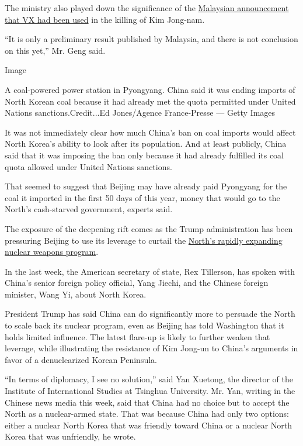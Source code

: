 The ministry also played down the significance of the
\href{https://www.nytimes.com/2017/02/23/world/asia/kim-jong-nam-vx-nerve-agent-.html}{Malaysian
announcement that VX had been used} in the killing of Kim Jong-nam.

``It is only a preliminary result published by Malaysia, and there is
not conclusion on this yet,'' Mr. Geng said.

Image

A coal-powered power station in Pyongyang. China said it was ending
imports of North Korean coal because it had already met the quota
permitted under United Nations sanctions.Credit...Ed Jones/Agence
France-Presse --- Getty Images

It was not immediately clear how much China's ban on coal imports would
affect North Korea's ability to look after its population. And at least
publicly, China said that it was imposing the ban only because it had
already fulfilled its coal quota allowed under United Nations sanctions.

That seemed to suggest that Beijing may have already paid Pyongyang for
the coal it imported in the first 50 days of this year, money that would
go to the North's cash-starved government, experts said.

The exposure of the deepening rift comes as the Trump administration has
been pressuring Beijing to use its leverage to curtail the
\href{https://www.nytimes.com/2017/02/17/world/asia/north-korea-nuclear-threat.html}{North's
rapidly expanding nuclear weapons program}.

In the last week, the American secretary of state, Rex Tillerson, has
spoken with China's senior foreign policy official, Yang Jiechi, and the
Chinese foreign minister, Wang Yi, about North Korea.

President Trump has said China can do significantly more to persuade the
North to scale back its nuclear program, even as Beijing has told
Washington that it holds limited influence. The latest flare-up is
likely to further weaken that leverage, while illustrating the
resistance of Kim Jong-un to China's arguments in favor of a
denuclearized Korean Peninsula.

``In terms of diplomacy, I see no solution,'' said Yan Xuetong, the
director of the Institute of International Studies at Tsinghua
University. Mr. Yan, writing in the Chinese news media this week, said
that China had no choice but to accept the North as a nuclear-armed
state. That was because China had only two options: either a nuclear
North Korea that was friendly toward China or a nuclear North Korea that
was unfriendly, he wrote.

